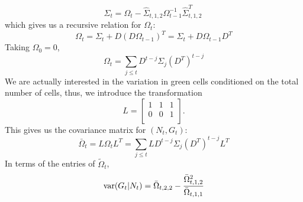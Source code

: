 \documentclass{article}
\begin{document}
 \begin{equation}
 \Sigma_t = \Omega_{t} - \hat{\Sigma}_{t,1,2} \Omega_{t-1}^{-1}\hat{\Sigma}_{t,1,2}^T\
 \end{equation}
 which gives us a recursive relation for $\Omega_t$: 
 \begin{equation}
 \Omega_{t} =  \Sigma_t + D(D\Omega_{t-1})^T =  \Sigma_t + D\Omega_{t-1}D^T
 \end{equation}
 Taking $\Omega_{0} = 0$, 
 \begin{equation}
  \Omega_{t} = \sum_{j\le t}D^{t-j}\Sigma_j \left(D^T\right)^{t-j}
 \end{equation}
 We are actually interested in the variation in green cells conditioned on the total number of cells, thus, we introduce the transformation 
 \begin{equation}
 L = \left[ \begin{array}{ccc}
1  & 1 &1 \\
0  & 0& 1 \\
\end{array}\right].
 \end{equation} 
 This gives us the covariance matrix for $(N_t,G_t)$:
 \begin{equation}
  \bar{\Omega}_{t} =L\Omega_t L^T =  \sum_{j\le t}LD^{t-j}\Sigma_j \left(D^T\right)^{t-j}L^T
 \end{equation}
 In terms of the entries of $ \tilde{\Omega}_{t}$, 
 \begin{equation}
 {\rm var}(G_t|N_t) = \bar{\Omega}_{t,2,2} - \frac{\bar{\Omega}_{t,1,2}^2}{ \bar{\Omega}_{t,1,1} }
 \end{equation}







\end{document}
